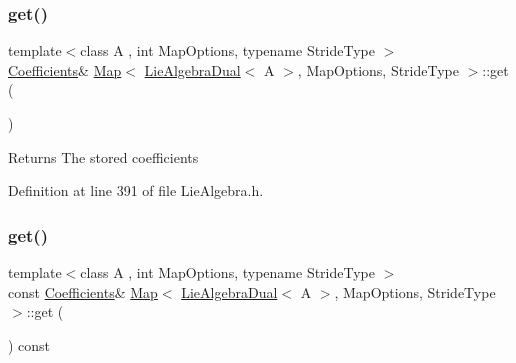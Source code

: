 \subsubsection{\texorpdfstring{get()}{get()}\hspace{0.1cm}{\footnotesize\ttfamily [1/2]}}
{\footnotesize\ttfamily template$<$class A , int Map\+Options, typename Stride\+Type $>$ \\
\hyperlink{class_map_3_01_lie_algebra_dual_3_01_a_01_4_00_01_map_options_00_01_stride_type_01_4_ab39602ca662c12f4aa9031d05157fb73}{Coefficients}\& \hyperlink{class_map_3_01_lie_algebra_dual_3_01_a_01_4_00_01_map_options_00_01_stride_type_01_4_a343da7ed6d4069324cd174c8fa51a43f}{Map}$<$ \hyperlink{class_lie_algebra_dual}{Lie\+Algebra\+Dual}$<$ A $>$, Map\+Options, Stride\+Type $>$\+::get (\begin{DoxyParamCaption}{ }\end{DoxyParamCaption})\hspace{0.3cm}{\ttfamily [inline]}}

\begin{DoxyReturn}{Returns}
The stored coefficients 
\end{DoxyReturn}


Definition at line 391 of file Lie\+Algebra.\+h.

\hypertarget{class_map_3_01_lie_algebra_dual_3_01_a_01_4_00_01_map_options_00_01_stride_type_01_4_ad394c3da74046cb6660b62e9b7651b2a}{}\label{class_map_3_01_lie_algebra_dual_3_01_a_01_4_00_01_map_options_00_01_stride_type_01_4_ad394c3da74046cb6660b62e9b7651b2a} 
\subsubsection{\texorpdfstring{get()}{get()}\hspace{0.1cm}{\footnotesize\ttfamily [2/2]}}
{\footnotesize\ttfamily template$<$class A , int Map\+Options, typename Stride\+Type $>$ \\
const \hyperlink{class_map_3_01_lie_algebra_dual_3_01_a_01_4_00_01_map_options_00_01_stride_type_01_4_ab39602ca662c12f4aa9031d05157fb73}{Coefficients}\& \hyperlink{class_map_3_01_lie_algebra_dual_3_01_a_01_4_00_01_map_options_00_01_stride_type_01_4_a343da7ed6d4069324cd174c8fa51a43f}{Map}$<$ \hyperlink{class_lie_algebra_dual}{Lie\+Algebra\+Dual}$<$ A $>$, Map\+Options, Stride\+Type $>$\+::get (\begin{DoxyParamCaption}{ }\end{DoxyParamCaption}) const\hspace{0.3cm}{\ttfamily [inline]}}

